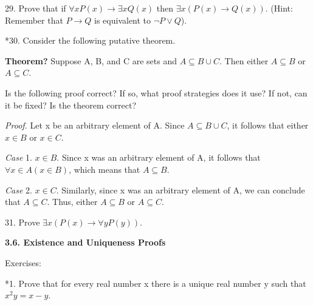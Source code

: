 \documentclass{article}
\begin{document}
29. Prove that if $\forall x P(x) \to \exists x Q(x)$ then $\exists x(P(x) \to Q(x))$. (Hint: Remember
that $P \to Q$ is equivalent to $\neg P \lor Q$).

\vspace{30pt}



\vspace{30pt}

*30. Consider the following putative theorem.

\textbf{Theorem?} Suppose A, B, and C are sets and $A \subseteq B \cup C$. Then either
$A \subseteq B$ or $A \subseteq C$.

Is the following proof correct? If so, what proof strategies does it use?
If not, can it be fixed? Is the theorem correct?

\textit{Proof.} Let x be an arbitrary element of A. Since $A \subseteq B \cup C$, it follows
that either $x \in B$ or $x \in C$.

\textit{Case} 1. $x \in B$. Since x was an arbitrary element of A, it follows that
$\forall x \in A(x \in B)$, which means that $A \subseteq B$.

\textit{Case} 2. $x \in C$. Similarly, since x was an arbitrary element of A, we
can conclude that $A \subseteq C$.
Thus, either $A \subseteq B$ or $A \subseteq C$.

\vspace{30pt}



\vspace{30pt}

31. Prove $\exists x (P(x) \to \forall y P(y))$.
\vspace{30pt}

\vspace{50pt}

\textbf{3.6. Existence and Uniqueness Proofs}

Exercises:

\vspace{30pt}



\vspace{30pt}

*1. Prove that for every real number x there is a unique real number y such
that $x^2 y = x - y$.

\vspace{30pt}



\vspace{30pt}
\end{document}

